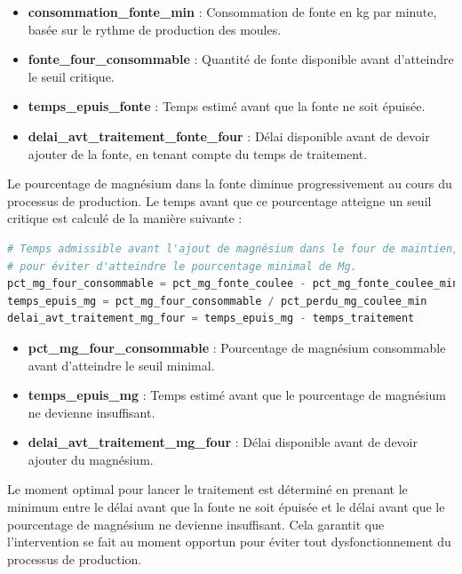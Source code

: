 \documentclass[12pt]{article}
\begin{document}
\begin{itemize}
    \item \textbf{consommation\_fonte\_min} : Consommation de fonte en kg par minute, basée sur le rythme de production des moules.
    \item \textbf{fonte\_four\_consommable} : Quantité de fonte disponible avant d'atteindre le seuil critique.
    \item \textbf{temps\_epuis\_fonte} : Temps estimé avant que la fonte ne soit épuisée.
    \item \textbf{delai\_avt\_traitement\_fonte\_four} : Délai disponible avant de devoir ajouter de la fonte, en tenant compte du temps de traitement.
\end{itemize}


Le pourcentage de magnésium dans la fonte diminue progressivement au 
cours du processus de production. Le temps avant que ce pourcentage 
atteigne un seuil critique est calculé de la manière suivante :

\begin{lstlisting}[language=Python, caption=Calcul du temps avant épuisement du magnésium]
# Temps admissible avant l'ajout de magnésium dans le four de maintien,
# pour éviter d'atteindre le pourcentage minimal de Mg.
pct_mg_four_consommable = pct_mg_fonte_coulee - pct_mg_fonte_coulee_min
temps_epuis_mg = pct_mg_four_consommable / pct_perdu_mg_coulee_min
delai_avt_traitement_mg_four = temps_epuis_mg - temps_traitement
\end{lstlisting}

\begin{itemize}
    \item \textbf{pct\_mg\_four\_consommable} : Pourcentage de magnésium consommable avant d'atteindre le seuil minimal.
    \item \textbf{temps\_epuis\_mg} : Temps estimé avant que le pourcentage de magnésium ne devienne insuffisant.
    \item \textbf{delai\_avt\_traitement\_mg\_four} : Délai disponible avant de devoir ajouter du magnésium.
\end{itemize}



Le moment optimal pour lancer le traitement est déterminé en prenant le 
minimum entre le délai avant que la fonte ne soit épuisée et le délai 
avant que le pourcentage de magnésium ne devienne insuffisant. Cela 
garantit que l'intervention se fait au moment opportun pour éviter tout 
dysfonctionnement du processus de production.
\end{document}
